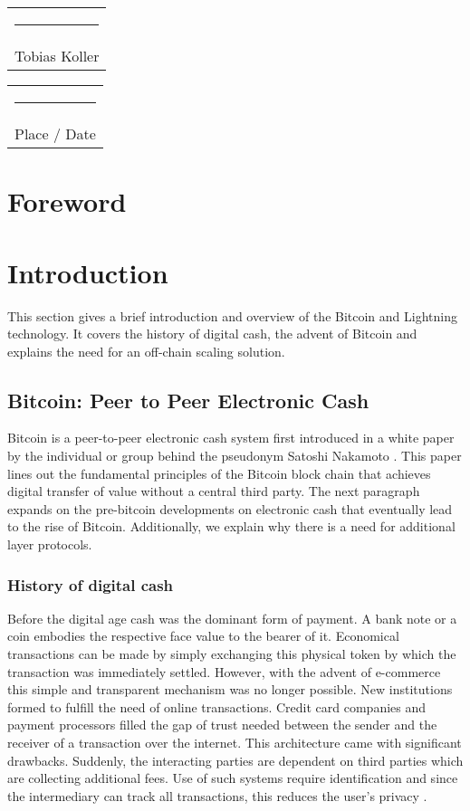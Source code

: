 \documentclass[final]{fhnwreport}       %
\begin{document}
\vspace*{4em}\noindent
\hfill%
\begin{tabular}[t]{c}
  \rule{10em}{0.4pt}\\Tobias Koller 
\end{tabular}%
\hfill%
\begin{tabular}[t]{c}
  \rule{10em}{0.4pt}\\ Place / Date
\end{tabular}%
\hfill\strut
\clearpage

\section*{Foreword}
\clearpage

\clearpage


\section{Introduction} 
This section gives a brief introduction and overview of the Bitcoin and Lightning technology. It covers the history of digital cash, the advent of Bitcoin and explains the need for an off-chain scaling solution. 

\subsection{Bitcoin: Peer to Peer Electronic Cash}\label{subsec:peertopeer}
Bitcoin is a peer-to-peer electronic cash system first introduced in a white paper by the individual or group behind the pseudonym Satoshi Nakamoto \citep{nakamoto_bitcoin_2008}. This paper lines out the fundamental principles of the Bitcoin block chain  that achieves digital transfer of value without a central third party. The next paragraph expands on the pre-bitcoin developments on electronic cash that eventually lead to the rise of Bitcoin. Additionally, we explain why there is a need for additional layer protocols.

\subsubsection{History of digital cash}
Before the digital age cash was the dominant form of payment. A bank note or a coin embodies the respective face value to the bearer of it. Economical transactions can be made by simply exchanging this physical token by which the transaction was immediately settled. However, with the advent of e-commerce this simple and transparent mechanism was no longer possible. New institutions formed to fulfill the need of online transactions. Credit card companies and payment processors filled the gap of trust needed between the sender and the receiver of a transaction over the internet. This architecture came with significant drawbacks. Suddenly, the interacting parties are dependent on third parties which are collecting additional fees. Use of such systems require identification and since the intermediary can track all transactions, this reduces the user's privacy \citep{narayanan_bitcoin_2016}.
\end{document}
